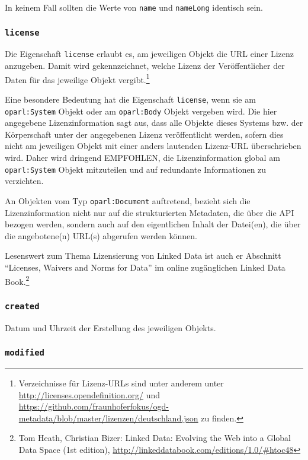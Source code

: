 \documentclass[,a4paper]{article}
\begin{document}
In keinem Fall sollten die Werte von \texttt{name} und \texttt{nameLong}
identisch sein.

\subsubsection{\texttt{license}}\label{license}

Die Eigenschaft \texttt{license} erlaubt es, am jeweiligen Objekt die
URL einer Lizenz anzugeben. Damit wird gekennzeichnet, welche Lizenz der
Veröffentlicher der Daten für das jeweilige Objekt vergibt.\footnote{Verzeichnisse
  für Lizenz-URLs sind unter anderem unter
  \url{http://licenses.opendefinition.org/} und
  \url{https://github.com/fraunhoferfokus/ogd-metadata/blob/master/lizenzen/deutschland.json}
  zu finden.}

Eine besondere Bedeutung hat die Eigenschaft \texttt{license}, wenn sie
am \texttt{oparl:System} Objekt oder am \texttt{oparl:Body} Objekt
vergeben wird. Die hier angegebene Lizenzinformation sagt aus, dass alle
Objekte dieses Systems bzw. der Körperschaft unter der angegebenen
Lizenz veröffentlicht werden, sofern dies nicht am jeweiligen Objekt mit
einer anders lautenden Lizenz-URL überschrieben wird. Daher wird
dringend EMPFOHLEN, die Lizenzinformation global am
\texttt{oparl:System} Objekt mitzuteilen und auf redundante
Informationen zu verzichten.

An Objekten vom Typ \texttt{oparl:Document} auftretend, bezieht sich die
Lizenzinformation nicht nur auf die strukturierten Metadaten, die über
die API bezogen werden, sondern auch auf den eigentlichen Inhalt der
Datei(en), die über die angebotene(n) URL(s) abgerufen werden können.

Lesenswert zum Thema Lizensierung von Linked Data ist auch er Abschnitt
``Licenses, Waivers and Norms for Data'' im online zugänglichen Linked
Data Book.\footnote{Tom Heath, Christian Bizer: Linked Data: Evolving
  the Web into a Global Data Space (1st edition),
  \url{http://linkeddatabook.com/editions/1.0/\#htoc48}}

\subsubsection{\texttt{created}}\label{created}

Datum und Uhrzeit der Erstellung des jeweiligen Objekts.

\subsubsection{\texttt{modified}}\label{modified}
\end{document}
